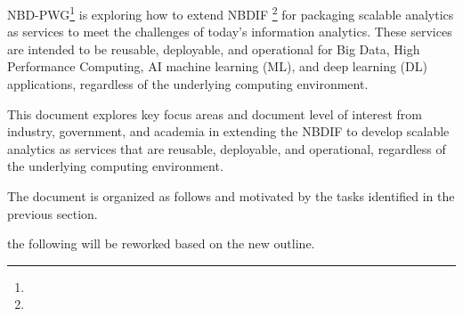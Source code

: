 NBD-PWG\footnote{} is exploring how
to extend NBDIF \footnote{} for packaging scalable analytics as services to meet
the challenges of today’s information analytics. These services are
intended to be reusable, deployable, and operational for Big Data,
High Performance Computing, AI machine learning (ML), and deep
learning (DL) applications, regardless of the underlying computing
environment.

This document explores key focus areas and document level of interest
from industry, government, and academia in extending the NBDIF to
develop scalable analytics as services that are reusable, deployable,
and operational, regardless of the underlying computing environment.

The document is organized as follows and motivated by the tasks
identified in the previous section.

 the following will be reworked based on the new outline.

